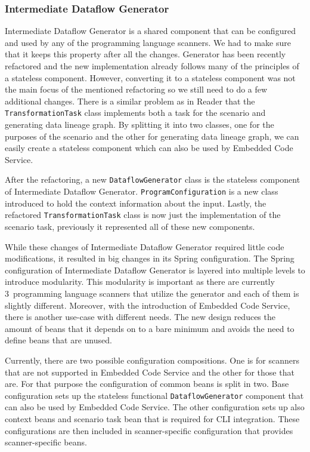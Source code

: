 \subsubsection{Intermediate Dataflow Generator}
Intermediate Dataflow Generator is a shared component that can be configured and used by any of the programming language scanners. We had to make sure that it keeps this property after all the changes. Generator has been recently refactored and the new implementation already follows many of the principles of a stateless component. However, converting it to a stateless component was not the main focus of the mentioned refactoring so we still need to do a few additional changes. There is a similar problem as in Reader that the \texttt{TransformationTask} class implements both a task for the scenario and generating data lineage graph. By splitting it into two classes, one for the purposes of the scenario and the other for generating data lineage graph, we can easily create a stateless component which can also be used by Embedded Code Service.
\par
After the refactoring, a new \texttt{DataflowGenerator} class is the stateless component of Intermediate Dataflow Generator. \texttt{ProgramConfiguration} is a new class introduced to hold the context information about the input. Lastly, the refactored \texttt{TransformationTask} class is now just the implementation of the scenario task, previously it represented all of these new components.
\par
While these changes of Intermediate Dataflow Generator required little code modifications, it resulted in big changes in its Spring configuration. The Spring configuration of Intermediate Dataflow Generator is layered into multiple levels to introduce modularity. This modularity is important as there are currently 3~programming language scanners that utilize the generator and each of them is slightly different. Moreover, with the introduction of Embedded Code Service, there is another use-case with different needs. The new design reduces the amount of beans that it depends on to a bare minimum and avoids the need to define beans that are unused.
\par
Currently, there are two possible configuration compositions. One is for scanners that are not supported in Embedded Code Service and the other for those that are. For that purpose the configuration of common beans is split in two. Base configuration sets up the stateless functional \texttt{DataflowGenerator} component that can also be used by Embedded Code Service. The other configuration sets up also context beans and scenario task bean that is required for CLI integration. These configurations are then included in scanner-specific configuration that provides scanner-specific beans.
